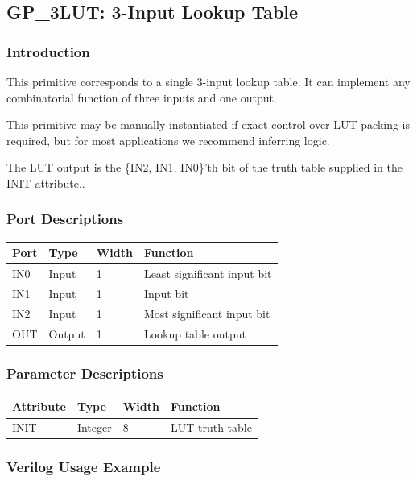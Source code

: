 \documentclass{article}
\begin{document}
\pagebreak
\subsection{GP\_3LUT: 3-Input Lookup Table}

\subsubsection{Introduction}
This primitive corresponds to a single 3-input lookup table. It can implement any combinatorial function of three 
inputs and one output.

This primitive may be manually instantiated if exact control over LUT packing is required, but for most applications we 
recommend inferring logic.

The LUT output is the \{IN2, IN1, IN0\}'th bit of the truth table supplied in the INIT attribute..

\subsubsection{Port Descriptions}

\begin{tabularx}{4in}{|l|l|l|X|}
\hline
{\bfseries Port} & {\bfseries Type} & {\bfseries Width} & {\bfseries Function} \\
\hline
IN0 & Input & 1 & Least significant input bit \\
\hline
IN1 & Input & 1 & Input bit \\
\hline
IN2 & Input & 1 & Most significant input bit \\
\hline
OUT & Output & 1 & Lookup table output \\
\hline
\end{tabularx}

\subsubsection{Parameter Descriptions}

\begin{tabularx}{4in}{|l|l|l|X|}
\hline
{\bfseries Attribute} & {\bfseries Type} & {\bfseries Width} & {\bfseries Function} \\
\hline
INIT & Integer & 8 & LUT truth table \\
\hline
\end{tabularx}

\subsubsection{Verilog Usage Example}
\end{document}
